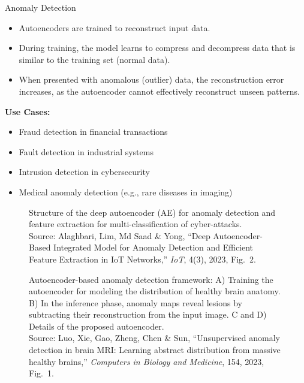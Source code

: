 \begin{frame}[allowframebreaks]{Anomaly Detection}
    \begin{itemize}
        \item Autoencoders are trained to reconstruct input data.
        \item During training, the model learns to compress and decompress data that is similar to the training set (normal data).
        \item When presented with anomalous (outlier) data, the reconstruction error increases, as the autoencoder cannot effectively reconstruct unseen patterns.
    \end{itemize}

    \textbf{Use Cases:}
    \begin{itemize}
        \item Fraud detection in financial transactions
        \item Fault detection in industrial systems
        \item Intrusion detection in cybersecurity
        \item Medical anomaly detection (e.g., rare diseases in imaging)
    \end{itemize}

    \framebreak
    \begin{figure}
        \centering
        \caption*{\small Structure of the deep autoencoder (AE) for anomaly detection and feature extraction for multi-classification of cyber-attacks.\\ {\scriptsize Source: Alaghbari, Lim, Md Saad \& Yong, ``Deep Autoencoder-Based Integrated Model for Anomaly Detection and Efficient Feature Extraction in IoT Networks,'' \emph{IoT}, 4(3), 2023, Fig.~2.}}
    \end{figure}

    \framebreak
    \begin{figure}
        \centering
        \caption*{\small Autoencoder-based anomaly detection framework: A) Training the autoencoder for modeling the distribution of healthy brain anatomy. B) In the inference phase, anomaly maps reveal lesions by subtracting their reconstruction from the input image. C and D) Details of the proposed autoencoder.\\ {\scriptsize Source: Luo, Xie, Gao, Zheng, Chen \& Sun, ``Unsupervised anomaly detection in brain MRI: Learning abstract distribution from massive healthy brains,'' \emph{Computers in Biology and Medicine}, 154, 2023, Fig.~1.}}
    \end{figure}
    
\end{frame}